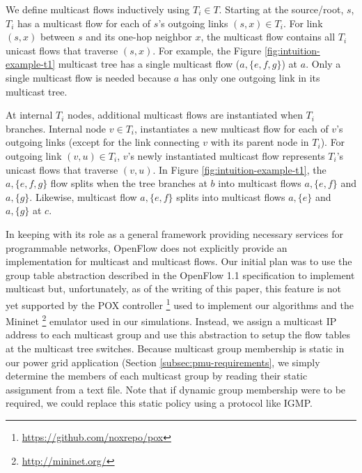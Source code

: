 We define multicast flows inductively using $T_i \in T$.  Starting at the source/root, $s$, $T_i$ has a multicast flow for each of $s$'s outgoing links $(s,x) \in T_i$. 
For link $(s,x)$ between $s$ and its one-hop neighbor $x$, the multicast flow contains all $T_i$ unicast flows that traverse $(s,x)$. %
For example, the Figure \ref{fig:intuition-example-t1} multicast tree has a single multicast flow ($a,\{e,f,g\}$) at $a$.   Only a single multicast flow is needed
because $a$ has only one outgoing link in its multicast tree.   

At internal $T_i$ nodes, additional multicast flows are instantiated when $T_i$ branches.  %
Internal node $v \in T_i$, instantiates a new multicast flow for each of $v$'s outgoing links (except for the link connecting $v$ with its parent node in $T_i$).  For outgoing link $(v,u) \in T_i$, 
$v$'s newly instantiated multicast flow represents $T_i$'s unicast flows that traverse $(v,u)$.  In Figure \ref{fig:intuition-example-t1}, the $a,\{e,f,g\}$ flow 
splits when the tree branches at $b$ into multicast flows $a,\{e,f\}$ and $a,\{g\}$.  Likewise, multicast flow $a,\{e,f\}$ splits into multicast flows $a,\{e\}$ and $a,\{g\}$ at $c$.

In keeping with its role as a general framework providing necessary services for programmable networks, OpenFlow does not explicitly provide an implementation for multicast and multicast flows.
Our initial plan was to use the group table abstraction described in the OpenFlow 1.1 specification \cite{OpenFlowSpec1.1} to implement multicast but, unfortunately,
as of the writing of this paper, this feature is not yet supported by the POX controller \footnote{\url{https://github.com/noxrepo/pox}} used to implement our algorithms and 
the Mininet \footnote{\url{http://mininet.org/}} emulator used in our simulations.  Instead, we assign a multicast IP address to each multicast group and use this abstraction to setup 
the flow tables at the multicast tree switches. Because multicast group membership is static in our power grid application (Section \ref{subsec:pmu-requirements}, 
we simply determine the members of each multicast group by reading their static assignment from a text file.  Note that if dynamic group membership were to be required, we could 
replace this static policy using a protocol like IGMP. 


